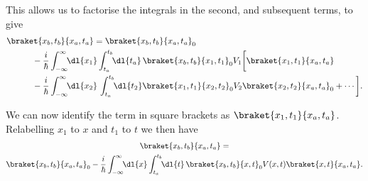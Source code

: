 \documentclass[fleqn]{NotesClass}
\begin{document}
    This allows us to factorise the integrals in the second, and subsequent terms, to give
    \begin{align}
        &\braket{x_b, t_b}{x_a, t_a} = \braket{x_b, t_b}{x_a, t_a}_0\notag\\
        &\qquad\quad{} - \frac{i}{\hbar} \int_{-\infty}^{\infty} \!\! \dl{x_1} \int_{t_a}^{t_b} \!\! \dl{t_a} \, \braket{x_b, t_b}{x_1, t_1}_0 V_1 \bigg[\braket{x_1, t_1}{x_a, t_a}\notag\\
        &\qquad\quad {} - \frac{i}{\hbar} \int_{-\infty}^{\infty} \!\! \dl{x_2} \, \int_{t_a}^{t_b} \!\! \dl{t_2} \braket{x_1, t_1}{x_2, t_2}_0 V_2 \braket{x_2, t_2}{x_a, t_a}_0 + \dotsb \bigg].\label{eqn:transition amplitude 2}
    \end{align}
    
    We can now identify the term in square brackets as \(\braket{x_1, t_1}{x_a, t_a}\).
    Relabelling \(x_1\) to \(x\) and \(t_1\) to \(t\) we then have
    \begin{multline}\label{eqn:transition amplitude}
        \braket{x_b, t_b}{x_a, t_a} =\\
        \braket{x_b, t_b}{x_a, t_a}_0 - \frac{i}{\hbar} \int_{-\infty}^{\infty} \!\! \dl{x} \int_{t_a}^{t_b} \!\! \dl{t} \, \braket{x_b, t_b}{x, t}_0 V(x, t) \braket{x, t}{x_a, t_a}.
    \end{multline}
    
\end{document}
